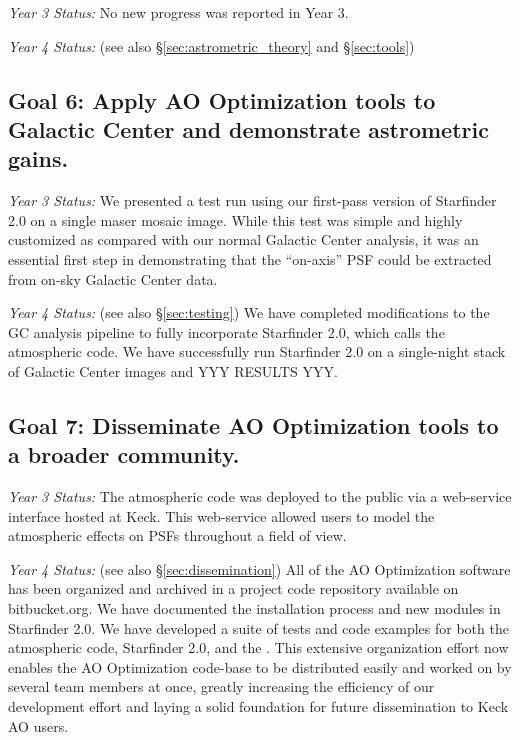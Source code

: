 \noindent
\textit{Year 3 Status:}
No new progress was reported in Year 3.

\noindent
\textit{Year 4 Status:}
(see also \S\ref{sec:astrometric_theory} and \S\ref{sec:tools})


\subsection{Goal 6: Apply AO Optimization tools to Galactic Center and demonstrate
  astrometric gains.}

\noindent
\textit{Year 3 Status:}
We presented a test run using our first-pass version of Starfinder
2.0 on a single maser mosaic image. While this test was simple and highly
customized as compared with our normal Galactic Center
analysis, it was an essential first step in demonstrating that the
``on-axis'' PSF could be extracted from on-sky Galactic Center data.
 
\noindent
\textit{Year 4 Status:}
(see also \S\ref{sec:testing})
 We have completed modifications to the GC analysis pipeline to fully
incorporate Starfinder 2.0, which calls the atmospheric code. We have
successfully run Starfinder 2.0 on a single-night stack of Galactic
Center images and YYY RESULTS YYY.


\subsection{Goal 7: Disseminate AO Optimization tools to a broader community.}

\noindent
\textit{Year 3 Status:}
The atmospheric code was deployed to the public via a web-service
interface hosted at Keck. This web-service allowed users to model
the atmospheric effects on PSFs throughout a field of view. 

\noindent
\textit{Year 4 Status:}
(see also \S\ref{sec:dissemination})
All of the AO Optimization software has been organized and archived in
a project code repository available on bitbucket.org. We have
documented the installation process and new modules in Starfinder
2.0. We have developed a suite of tests and code examples for both the
atmospheric code, Starfinder 2.0, and the . This extensive
organization effort now enables the AO Optimization code-base to be
distributed easily and worked on by several team members at once,
greatly increasing the efficiency of our development effort and laying
a solid foundation for future dissemination to Keck AO users.


  
  
  
  